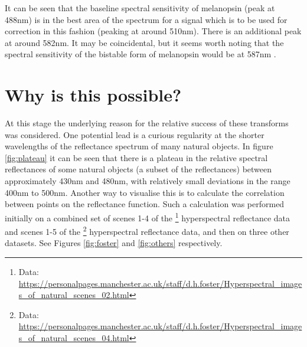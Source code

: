 It can be seen that the baseline spectral sensitivity of melanopsin (peak at 488nm) is in the best area of the spectrum for a signal which is to be used for correction in this fashion (peaking at around 510nm). There is an additional peak at around 582nm. It may be coincidental, but it seems worth noting that the spectral sensitivity of the bistable form of melanopsin would be at 587nm \citep{mure_melanopsin_2009}.



\section{Why is this possible?}


At this stage the underlying reason for the relative success of these transforms was considered. One potential lead is a curious regularity at the shorter wavelengths of the reflectance spectrum of many natural objects. In figure \ref{fig:plateau} it can be seen that there is a plateau in the relative spectral reflectances of some natural objects (a subset of the \citet{vrhel_measurement_1994} reflectances) between approximately 430nm and 480nm, with relatively small deviations in the range 400nm to 500nm. Another way to visualise this is to calculate the correlation between points on the reflectance function. Such a calculation was performed initially on a combined set of scenes 1-4 of the
\citet{nascimento_statistics_2002}\footnote{Data: \url{https://personalpages.manchester.ac.uk/staff/d.h.foster/Hyperspectral_images_of_natural_scenes_02.html}} hyperspectral reflectance data and
scenes 1-5 of the 
\citet{foster_frequency_2006}\footnote{Data: \url{https://personalpages.manchester.ac.uk/staff/d.h.foster/Hyperspectral_images_of_natural_scenes_04.html}}
hyperspectral reflectance data, and then on three other datasets. See Figures \ref{fig:foster} and \ref{fig:others} respectively.

